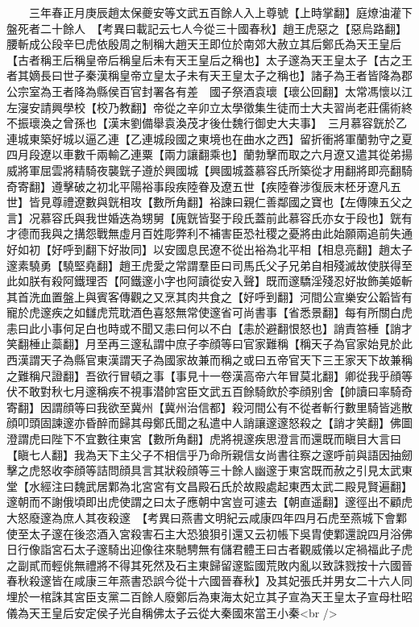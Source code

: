 　　三年春正月庚辰趙太保夔安等文武五百餘人入上尊號【上時掌翻】庭燎油灌下盤死者二十餘人　【考異曰載記云七人今從三十國春秋】趙王虎惡之【惡烏路翻】腰斬成公段辛巳虎依殷周之制稱大趙天王即位於南郊大赦立其后鄭氏為天王皇后【古者稱王后稱皇帝后稱皇后未有天王皇后之稱也】太子邃為天王皇太子【古之王者其嫡長曰世子秦漢稱皇帝立皇太子未有天王皇太子之稱也】諸子為王者皆降為郡公宗室為王者降為縣侯百官封署各有差　國子祭酒袁瓌【瓌公回翻】太常馮懷以江左寖安請興學校【校乃教翻】帝從之辛卯立太學徵集生徒而士大夫習尚老莊儒術終不振瓌渙之曾孫也【漢末劉備舉袁渙茂才後仕魏行御史大夫事】　三月慕容皝於乙連城東築好城以逼乙連【乙連城段國之東境也在曲水之西】留折衝將軍蘭勃守之夏四月段遼以車數千兩輸乙連粟【兩力讓翻乘也】蘭勃擊而取之六月遼又遣其從弟揚威將軍屈雲將精騎夜襲皝子遵於興國城【興國城蓋慕容氏所築從才用翻將即亮翻騎奇寄翻】遵擊破之初北平陽裕事段疾陸眷及遼五世【疾陸眷涉復辰末柸牙遼凡五世】皆見尊禮遼數與皝相攻【數所角翻】裕諫曰親仁善鄰國之寶也【左傳陳五父之言】况慕容氏與我世婚迭為甥舅【廆皝皆娶于段氏蓋前此慕容氏亦女于段也】皝有才德而我與之搆怨戰無虛月百姓彫弊利不補害臣恐社稷之憂將由此始願兩追前失通好如初【好呼到翻下好妝同】以安國息民遼不從出裕為北平相【相息亮翻】趙太子邃素驍勇【驍堅堯翻】趙王虎愛之常謂羣臣曰司馬氏父子兄弟自相殘滅故使朕得至此如朕有殺阿鐵理否【阿鐵邃小字也阿讀從安入聲】既而邃驕淫殘忍好妝飾美姬斬其首洗血置盤上與賓客傳觀之又烹其肉共食之【好呼到翻】河間公宣樂安公韜皆有寵於虎邃疾之如讎虎荒耽酒色喜怒無常使邃省可尚書事【省悉景翻】每有所關白虎恚曰此小事何足白也時或不聞又恚曰何以不白【恚於避翻恨怒也】誚責笞棰【誚才笑翻棰止蘂翻】月至再三邃私謂中庶子李顔等曰官家難稱【稱天子為官家始見於此西漢謂天子為縣官東漢謂天子為國家故兼而稱之或曰五帝官天下三王家天下故兼稱之難稱尺證翻】吾欲行冒頓之事【事見十一卷漢高帝六年冒莫北翻】卿從我乎顔等伏不敢對秋七月邃稱疾不視事潜帥宮臣文武五百餘騎飲於李顔别舍【帥讀曰率騎奇寄翻】因謂顔等曰我欲至冀州【冀州治信都】殺河間公有不從者斬行數里騎皆逃散顔叩頭固諫邃亦昏醉而歸其母鄭氏聞之私遣中人誚讓邃邃怒殺之【誚才笑翻】佛圖澄謂虎曰陛下不宜數往東宮【數所角翻】虎將視邃疾思澄言而還既而瞋目大言曰【瞋七人翻】我為天下主父子不相信乎乃命所親信女尚書往察之邃呼前與語因抽劒擊之虎怒收李顔等詰問顔具言其狀殺顔等三十餘人幽邃于東宮既而赦之引見太武東堂【水經注曰魏武居鄴為北宮宮有文昌殿石氏於故殿處起東西太武二殿見賢遍翻】邃朝而不謝俄頃即出虎使謂之曰太子應朝中宮豈可遽去【朝直遥翻】邃徑出不顧虎大怒廢邃為庶人其夜殺邃　【考異曰燕書文明紀云咸康四年四月石虎至燕城下會鄴使至太子邃在後恣酒入宮殺害石主大恐狼狽引還又云初帳下吳胄使鄴還說四月浴佛日行像詣宮石太子邃騎出迎像往來馳騁無有儲君體王曰古者觀威儀以定禍福此子虎之副貳而輕佻無禮將不得其死然及石主東歸留邃監國荒敗内亂以致誅戮按十六國晉春秋殺邃皆在咸康三年燕書恐誤今從十六國晉春秋】及其妃張氏并男女二十六人同埋於一棺誅其宮臣支黨二百餘人廢鄭后為東海太妃立其子宣為天王皇太子宣母杜昭儀為天王皇后安定侯子光自稱佛太子云從大秦國來當王小秦<br />
